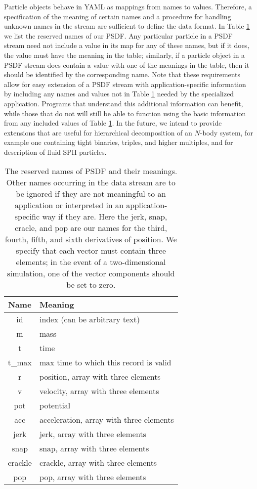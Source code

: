 \documentclass[5p,authoryear]{elsarticle}
\begin{document}
Particle objects behave in YAML as mappings from names to values.
Therefore, a specification of the meaning of certain names and a
procedure for handling unknown names in the stream are sufficient to
define the data format.  In Table \ref{tab:names} we list the reserved
names of our PSDF.  Any particular particle in a PSDF stream need not
include a value in its map for any of these names, but if it does, the
value must have the meaning in the table; similarly, if a particle
object in a PSDF stream does contain a value with one of the meanings
in the table, then it should be identified by the corresponding name.
Note that these requirements allow for easy extension of a PSDF stream
with application-specific information by including any names and
values not in Table \ref{tab:names} needed by the specialized
application.  Programs that understand this additional information can
benefit, while those that do not will still be able to function using
the basic information from any included values of Table
\ref{tab:names}.  In the future, we intend to provide extensions that
are useful for hierarchical decomposition of an $N$-body system, for
example one containing tight binaries, triples, and higher multiples,
and for description of fluid SPH particles.

\begin{table}
\begin{tabular}{|c|l|}
\hline
Name & Meaning\\
\hline
id & index (can be arbitrary text)\\
m & mass\\
t & time\\
t\_max & max time to which this record is valid \\
r  & position, array with three elements\\
v  & velocity, array with three elements\\
pot  & potential\\
acc  & acceleration, array with three elements\\
jerk  & jerk, array with three elements\\
snap  & snap, array with three elements\\
crackle  & crackle, array with three elements\\
pop  & pop, array with three elements\\
\hline
\end{tabular}
\caption{\label{tab:names} The reserved names of PSDF and their
  meanings.  Other names occurring in the data stream are to be
  ignored if they are not meaningful to an application or interpreted
  in an application-specific way if they are.  Here the jerk,
  snap, cracle, and pop are our names for the third, fourth, fifth,
  and sixth derivatives of position.  We specify that each vector must
  contain three elements; in the event of a two-dimensional
  simulation, one of the vector components should be set to zero.}
\end{table}
\end{document}

